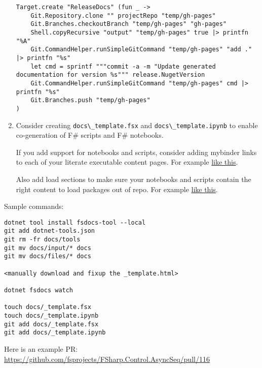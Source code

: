 \documentclass{article}
\begin{document}
\begin{enumerate}
\begin{lstlisting}
Target.create "ReleaseDocs" (fun _ ->
    Git.Repository.clone "" projectRepo "temp/gh-pages"
    Git.Branches.checkoutBranch "temp/gh-pages" "gh-pages"
    Shell.copyRecursive "output" "temp/gh-pages" true |> printfn "%A"
    Git.CommandHelper.runSimpleGitCommand "temp/gh-pages" "add ." |> printfn "%s"
    let cmd = sprintf """commit -a -m "Update generated documentation for version %s""" release.NugetVersion
    Git.CommandHelper.runSimpleGitCommand "temp/gh-pages" cmd |> printfn "%s"
    Git.Branches.push "temp/gh-pages"
)

\end{lstlisting}

\item 

Consider creating \texttt{docs{\textbackslash}\_template.fsx} and \texttt{docs{\textbackslash}\_template.ipynb} to enable co-generation of F\# scripts and F\# notebooks.


If you add support for notebooks and scripts, consider adding mybinder links to each of your literate executable content pages. For example \href{https://github.com/fsprojects/FSharp.Formatting/blob/master/docs/literate.fsx\#L19}{like this}.


Also add load sections to make sure your notebooks and scripts contain the right content to load packages out of repo.  For example \href{https://github.com/fsprojects/FSharp.Formatting/blob/master/docs/literate.fsx\#L1}{like this}.

\end{enumerate}



Sample commands:
\begin{lstlisting}
dotnet tool install fsdocs-tool --local
git add dotnet-tools.json   
git rm -fr docs/tools
git mv docs/input/* docs
git mv docs/files/* docs

<manually download and fixup the _template.html>

dotnet fsdocs watch

touch docs/_template.fsx
touch docs/_template.ipynb
git add docs/_template.fsx
git add docs/_template.ipynb

\end{lstlisting}


Here is an example PR: \href{https://github.com/fsprojects/FSharp.Control.AsyncSeq/pull/116}{https://github.com/fsprojects/FSharp.Control.AsyncSeq/pull/116}
\end{document}
